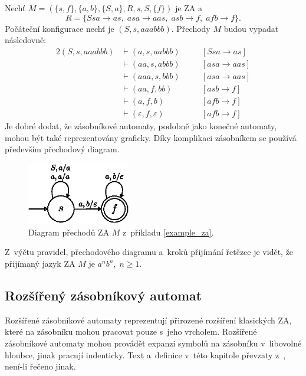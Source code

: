 \begin{example}\label{example_za}
    Nechť $M = (\{s, f\}, \{a, b\}, \{S, a\}, R, s, S, \{f\})$ je ZA a 
    \begin{equation*}
        R = \{Ssa \rightarrow as,\; asa \rightarrow aas,\; asb \rightarrow f,\; afb \rightarrow f\}.
    \end{equation*}
    Počáteční konfigurace nechť je $(S, s, aaabbb)$.
    Přechody $M$ budou vypadat následovně:
    \begin{alignat*}{2}
        (S, s, aaabbb) &\vdash (a, s, aabbb) \quad && [Ssa \rightarrow as] \\
                       &\vdash (aa, s, abbb) \quad && [asa \rightarrow aas] \\
                       &\vdash (aaa, s, bbb) \quad && [asa \rightarrow aas] \\
                       &\vdash (aa, f, bb) \quad   && [asb \rightarrow f] \\ 
                       &\vdash (a, f, b) \quad      && [afb \rightarrow f] \\
                       &\vdash (\varepsilon, f, \varepsilon) \quad && [afb \rightarrow f]
    \end{alignat*}
    Je dobré dodat, že zásobníkové automaty, podobně jako konečné automaty, mohou být také reprezentovány graficky.
    Díky komplikaci zásobníkem se používá především přechodový diagram.
    \begin{figure}[ht]
        \centering
        \includegraphics[width=0.4\textwidth]{obrazky-figures/za_diagram_prechodu.eps}
        \caption{Diagram přechodů ZA $M$ z~příkladu \ref{example_za}.}
        \label{fig_diagram_prechodu_za}
    \end{figure}
    Z~výčtu pravidel, přechodového diagramu a~kroků přijímání řetězce je vidět, že přijímaný jazyk ZA $M$ je $a^nb^n,\; n \geq 1$.
\end{example}

\subsection*{Rozšířený zásobníkový automat}\label{kap_rozsireny_ZA}
Rozšířené zásobníkové automaty reprezentují přirozené rozšíření klasických ZA, které na zásobníku mohou pracovat pouze s~jeho vrcholem.
Rozšířené zásobníkové automaty mohou provádět expanzi symbolů na zásobníku v~libovolné hloubce, jinak pracují indenticky.
Text a~definice v~této kapitole převzaty z~\cite{meduna2023automata, meduna_zemek_2014}, není-li řečeno jinak.

